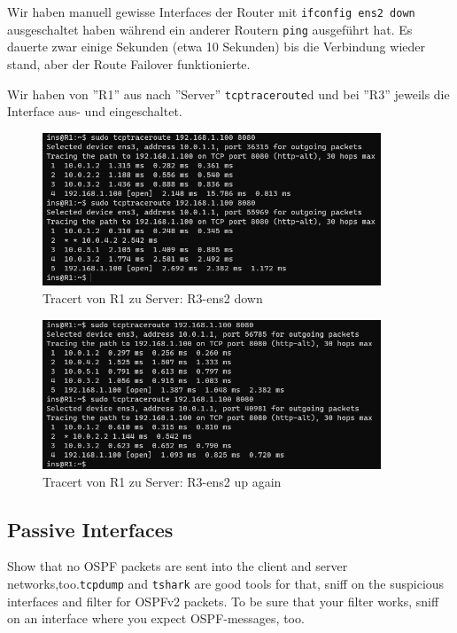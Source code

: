 \documentclass[11pt,titlepage]{article}
\newenvironment{shadedquotation}
 {\begin{shaded*}
  \quoting[leftmargin=0pt, vskip=0pt]
 }
 {\endquoting
 \end{shaded*}
}
\begin{document}
Wir haben manuell gewisse Interfaces der Router mit \lstinline!ifconfig ens2 down! ausgeschaltet haben während ein anderer Routern \lstinline!ping! ausgeführt hat. Es dauerte zwar einige Sekunden (etwa 10 Sekunden) bis die Verbindung wieder stand, aber der Route Failover funktionierte.

\medskip

Wir haben von ''R1'' aus nach ''Server'' \lstinline!tcptraceroute!d und bei ''R3'' jeweils die Interface aus- und eingeschaltet.

\begin{figure}[H]
  \begin{center}
    \includegraphics[width=0.90\textwidth]{images/tcptracert_R3-ens2-down.png}
    \caption{Tracert von R1 zu Server: R3-ens2 down}
    \label{fig:RouteFailoverDown}
  \end{center}
\end{figure}

\begin{figure}[H]
  \begin{center}
    \includegraphics[width=0.90\textwidth]{images/tcptracert_R3-ens2-up.png}
    \caption{Tracert von R1 zu Server: R3-ens2 up again}
    \label{fig:RouteFailoverUp}
  \end{center}
\end{figure}


\subsection{Passive Interfaces}
\label{subsec:PassiveInterfaces}
\begin{shadedquotation}
  Show that no OSPF packets are sent into the client and server networks,too.\lstinline!tcpdump! and \lstinline!tshark! are good tools for that, sniff on the suspicious interfaces and filter for OSPFv2 packets. To be sure that your filter works, sniff on an interface where you expect OSPF-messages, too.
\end{shadedquotation}
\end{document}
